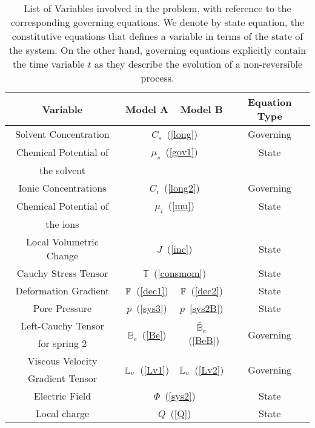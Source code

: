 \vspace{3mm}
\begin{table}
	\centering
	\begin{tabular}{c|c|c|c}
		\hline\addlinespace[2pt]
		Variable &  \hspace{1pt} Model A \hspace{1pt} & \hspace{1pt} Model B\hspace{1pt} & \hspace{4pt}Equation Type\hspace{4pt}\\
		\hline
		\hline\addlinespace[2.5pt]
		Solvent Concentration &  \multicolumn{2}{c|}{$C_s$~(\ref{long})}& Governing \\[2.5pt]
		Chemical Potential of & \multicolumn{2}{c|}{ $\mu_s$~(\ref{gov1})}& State \\
		the solvent &\multicolumn{2}{c|}{}&\\[2pt]
		Ionic Concentrations & \multicolumn{2}{c|}{$C_i$~(\ref{long2})}& Governing \\[3pt]
		Chemical Potential of & \multicolumn{2}{c|}{$\mu_i$~(\ref{mu}) }& State \\
		the ions &\multicolumn{2}{c|}{ }&\\[2pt]
		\hline\addlinespace[2pt]
		Local Volumetric Change & \multicolumn{2}{c|}{$J$~(\ref{inc})}& State \\[2.5pt]
		Cauchy Stress Tensor & 	\multicolumn{2}{c|}{$\mathbb{T}$~(\ref{consmom})}& State \\[2.5pt]
		Deformation Gradient & $\mathbb{F}$~(\ref{dec1})& $\mathbb{F}$~(\ref{dec2})& State \\[2.5pt]
		Pore Pressure & $p$~(\ref{sys3}) & $p$~\ref{sys2B})& State \\[2.5pt]
		Left-Cauchy Tensor& \multirow{2}{*}{$\mathbb{B}_e$~(\ref{Be})} & \multirow{2}{*}{$\mathbb{\bar{B}}_e$~(\ref{BeB})}&\multirow{2}{*}{Governing}\\
		for spring 2&&&\\
		Viscous Velocity & \multirow{2}{*}{$\mathbb{L}_v$~(\ref{Lv1})}&  \multirow{2}{*}{$\bar{\mathbb{L}}_v$~(\ref{Lv2})}&\multirow{2}{*}{Governing }\\
		Gradient Tensor&&&\\
		\hline\addlinespace[2pt]
		Electric Field & \multicolumn{2}{c|}{$\Phi$~(\ref{sys2})}& State \\
		Local charge & \multicolumn{2}{c|}{$Q$~(\ref{Q})}& State\\
		\hline 
		\hline
	\end{tabular}
	\vspace{3mm}
	\caption{List of Variables involved in the problem, with reference to the corresponding governing equations. We denote by state equation, the constitutive equations that defines a variable in terms of the state of the system. On the other hand, governing equations explicitly contain the time variable $t$ as they describe the evolution of a non-reversible process.}
	\label{summary}
\end{table}

